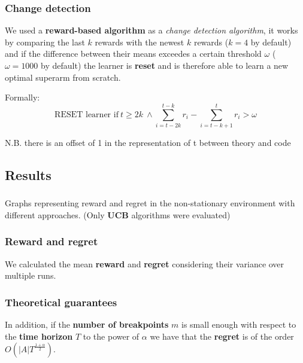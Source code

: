 
\begin{frame}
\frametitle{Change detection}

We used a \textbf{reward-based algorithm} as a \textit{change detection algorithm}, it works by comparing the last $k$ rewards with the newest $k$ rewards ($k=4$ by default) and if the difference between their means exceedes a certain threshold $\omega$ ($\omega=1000$ by default) the learner is \textbf{reset} and is therefore able to learn a new optimal superarm from scratch.

Formally:
\begin{displaymath}
    \text{RESET learner if} ~ t \geq 2k ~ \land \sum_{i=t-2k}^{t-k} r_i -\sum_{i=t-k+1}^t r_i > \omega
\end{displaymath}

\scriptsize N.B. there is an offset of 1 in the representation of t between theory and code

\end{frame}


\subsection{Results}


\begin{frame}
\frametitle{}
\framesubtitle{}


\scriptsize Graphs representing reward and regret in the non-stationary environment with different approaches. (Only \textbf{UCB} algorithms were evaluated)

\end{frame}


\begin{frame}
\frametitle{Reward and regret}

We calculated the mean \textbf{reward} and \textbf{regret} considering their variance over multiple runs.


\end{frame}


\begin{frame}
\frametitle{Theoretical guarantees}

In addition, if the \textbf{number of breakpoints} $m$ is small enough with respect to the \textbf{time horizon} $T$ to the power of $\alpha$ we have that the \textbf{regret} is of the order $O\left( \vert A \vert T^{\frac{1+\alpha}{2}} \right)$.

\end{frame}

